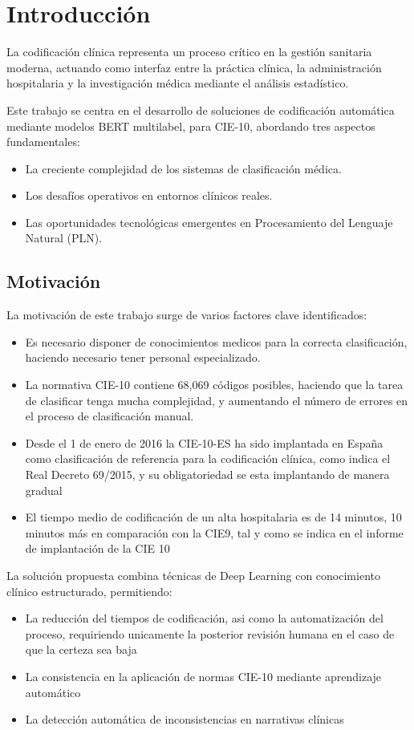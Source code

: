 \chapter{Introducción}
\label{cap:Introduccion}

La codificación clínica representa un proceso crítico en la gestión sanitaria moderna, actuando como interfaz entre la práctica clínica, la administración hospitalaria y la investigación médica mediante el análisis estadístico. 

Este trabajo se centra en el desarrollo de soluciones de codificación automática mediante modelos BERT multilabel, para CIE-10, abordando tres aspectos fundamentales:
\begin{itemize}
\item La creciente complejidad de los sistemas de clasificación médica.
\item Los desafíos operativos en entornos clínicos reales.
\item Las oportunidades tecnológicas emergentes en Procesamiento del Lenguaje Natural (PLN).
\end{itemize}

\section{Motivación}

La motivación de este trabajo surge de varios factores clave identificados:
\begin{itemize}
\item Es necesario disponer de conocimientos medicos para la correcta clasificación, haciendo necesario tener personal especializado.
\item La normativa CIE-10 contiene 68,069 códigos posibles, haciendo que la tarea de clasificar tenga mucha complejidad, y aumentando el número de errores en el proceso de clasificación manual.
\item Desde el 1 de enero de 2016 la CIE-10-ES ha sido implantada en España como clasificación de referencia para la codificación clínica, como indica el Real Decreto 69/2015, y su obligatoriedad se esta implantando de manera gradual
\item El tiempo medio de codificación de un alta hospitalaria es de 14 minutos, 10 minutos más en comparación con la CIE9, tal y como se indica en el informe de implantación de la CIE 10\cite{sanidad2016cie10}
\end{itemize}

La solución propuesta combina técnicas de Deep Learning con conocimiento clínico estructurado, permitiendo:
\begin{itemize}
\item La reducción del tiempos de codificación, asi como la automatización del proceso, requiriendo unicamente la posterior revisión humana en el caso de que la certeza sea baja
\item La consistencia en la aplicación de normas CIE-10 mediante aprendizaje automático
\item La detección automática de inconsistencias en narrativas clínicas
\end{itemize}


